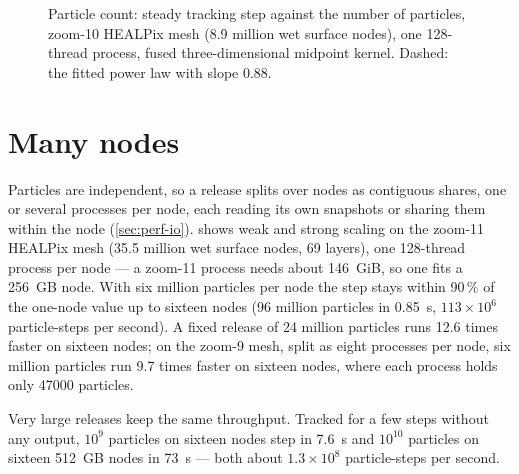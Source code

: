 \begin{figure}[t]
\centering
{}
\caption{Particle count: steady tracking step against the number of particles, zoom-10 HEALPix mesh
(8.9 million wet surface nodes), one 128-thread process, fused three-dimensional midpoint kernel.
Dashed: the fitted power law with slope 0.88.}
\label{fig:perf-particles}
\end{figure}

\section{Many nodes}\label{sec:perf-nodes}

Particles are independent, so a release splits over nodes as contiguous shares, one or several
processes per node, each reading its own snapshots or sharing them within the node
(\cref{sec:perf-io}).  shows weak and strong scaling on the zoom-11 HEALPix mesh
(35.5 million wet surface nodes, 69 layers), one 128-thread process per node --- a zoom-11 process
needs about \SI{146}{GiB}, so one fits a \SI{256}{GB} node. With six million particles per node the
step stays within 90\,\% of the one-node value up to sixteen nodes (96 million particles in
\SI{0.85}{s}, $113\times10^{6}$ particle-steps per second). A fixed release of 24 million particles
runs 12.6 times faster on sixteen nodes; on the zoom-9 mesh, split as eight processes per node, six
million particles run 9.7 times faster on sixteen nodes, where each process holds only
\num{47000} particles.

Very large releases keep the same throughput. Tracked for a few steps without any output, $10^{9}$
particles on sixteen nodes step in \SI{7.6}{s} and $10^{10}$ particles on sixteen \SI{512}{GB} nodes in
\SI{73}{s} --- both about $1.3\times10^{8}$ particle-steps per second.

